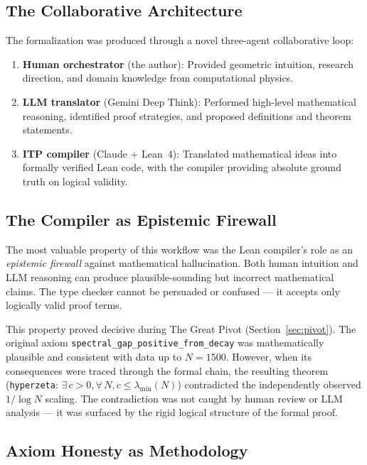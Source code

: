 \documentclass[11pt,a4paper]{article}
\theoremstyle{definition}
\theoremstyle{remark}
\newcommand{\lmin}{\lambda_{\min}}
\newcommand{\lean}[1]{\texttt{#1}}
\begin{document}
\subsection{The Collaborative Architecture}

The formalization was produced through a novel three-agent collaborative
loop:

\begin{enumerate}
  \item \textbf{Human orchestrator} (the author): Provided geometric
    intuition, research direction, and domain knowledge from computational
    physics.

  \item \textbf{LLM translator} (Gemini Deep Think): Performed high-level
    mathematical reasoning, identified proof strategies, and proposed
    definitions and theorem statements.

  \item \textbf{ITP compiler} (Claude + Lean~4): Translated mathematical
    ideas into formally verified Lean code, with the compiler providing
    absolute ground truth on logical validity.
\end{enumerate}

\subsection{The Compiler as Epistemic Firewall}

The most valuable property of this workflow was the Lean compiler's
role as an \emph{epistemic firewall} against mathematical hallucination.
Both human intuition and LLM reasoning can produce plausible-sounding
but incorrect mathematical claims. The type checker cannot be persuaded
or confused --- it accepts only logically valid proof terms.

This property proved decisive during The Great Pivot
(Section~\ref{sec:pivot}). The original axiom
\lean{spectral\_gap\_positive\_from\_decay} was mathematically plausible
and consistent with data up to $N = 1500$. However, when its consequences
were traced through the formal chain, the resulting theorem
(\lean{hyperzeta}: $\exists\, c > 0, \forall\, N, c \leq \lmin(N)$)
contradicted the independently observed $1/\!\log N$ scaling.
The contradiction was not caught by human review or LLM analysis ---
it was surfaced by the rigid logical structure of the formal proof.

\subsection{Axiom Honesty as Methodology}
\end{document}

